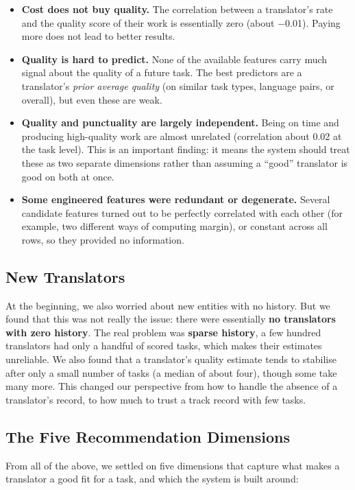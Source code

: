 \documentclass[9pt,a4paper,twoside]{utils/tau-class/tau}
\begin{document}
\begin{itemize}
    \item \textbf{Cost does not buy quality.} The correlation between a translator's rate and the quality score of their work is essentially zero (about $-$0.01). Paying more does not lead to better results.
    \item \textbf{Quality is hard to predict.} None of the available features carry much signal about the quality of a future task. The best predictors are a translator's \emph{prior average quality} (on similar task types, language pairs, or overall), but even these are weak.
    \item \textbf{Quality and punctuality are largely independent.} Being on time and producing high-quality work are almost unrelated (correlation about 0.02 at the task level). This is an important finding: it means the system should treat these as two separate dimensions rather than assuming a ``good'' translator is good on both at once.
    \item \textbf{Some engineered features were redundant or degenerate.} Several candidate features turned out to be perfectly correlated with each other (for example, two different ways of computing margin), or constant across all rows, so they provided no information.
\end{itemize}

\subsection{New Translators}

At the beginning, we also worried about new entities with no history. But we found that this was not really the issue: there were essentially \textbf{no translators with zero history}. The real problem was \textbf{sparse history}, a few hundred translators had only a handful of scored tasks, which makes their estimates unreliable. We also found that a translator's quality estimate tends to stabilise after only a small number of tasks (a median of about four), though some take many more. This changed our perspective from how to handle the absence of a translator's record, to how much to trust a track record with few tasks.

\subsection{The Five Recommendation Dimensions}

From all of the above, we settled on five dimensions that capture what makes a translator a good fit for a task, and which the system is built around:
\end{document}
